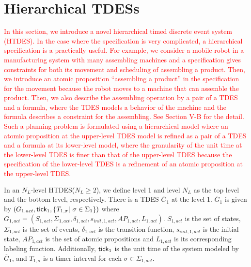 \documentclass{article}
\newcommand{\tick}{{\sf tick}}
\newcommand{\red}[1]{\textcolor{red}{#1}}
\begin{document}
\section{Hierarchical TDESs}\label{def:htdes}
%
\red{In this section, we introduce a novel hierarchical timed discrete event system (HTDES). In the case where the specification is very complicated, a hierarchical specification is a practically useful. For example, we consider a mobile robot in a manufacturing system with many assembling machines and a specification gives constraints for both its movement and scheduling of assembling a product. Then, we introduce an atomic proposition ``assembling a product'' in the specification for the movement because the robot moves to a machine that can assemble the product.  Then, we also describe the assembling operation by a pair of a TDES and a formula, where the TDES models a behavior of the machine and the formula describes a constraint for the assembling. See Section V-B for the detail. Such a planning problem is formulated using a hierarchical model where an atomic proposition at the upper-level TDES model is refined as a pair of a TDES and a formula at its lower-level model, where the granularity of the unit time at the lower-level TDES is finer than that of the upper-level TDES because the specification of the lower-level TDES is a refinement of an atomic proposition at the upper-level TDES. %
}
%
%

In an $N_L$-level HTDES($N_L\geq 2$), we define level 1 and level $N_L$ as the top level and the bottom level, respectively.
There is a TDES $\overline{G}_{1}$ at the level 1.
$\overline{G}_{1}$ is given by $({G}_{{1},act},\tick_{1},\{T_{1,\sigma}|~\sigma\in\Sigma_{1}\})$ where $G_{{1},act}=(S_{{1},act},\Sigma_{{1},act},\delta_{{1},act},s_{init,{1},act},AP_{{1},act},L_{{1},act})$.
$S_{{1},act}$ is the set of states, $\Sigma_{{1},act}$ is the set of events, $\delta_{{1},act}$ is the transition function, $s_{init,{1},act}$ is the initial state, $AP_{{1},act}$ is the set of atomic propositions and $L_{{1},act}$ is its corresponding labeling function.
Additionally, $\tick_1$ is the unit time of the system modeled by $\overline{G}_1$, and $T_{1,\sigma}$ is a timer interval for each $\sigma\in\Sigma_{{1},act}$.
\end{document}
